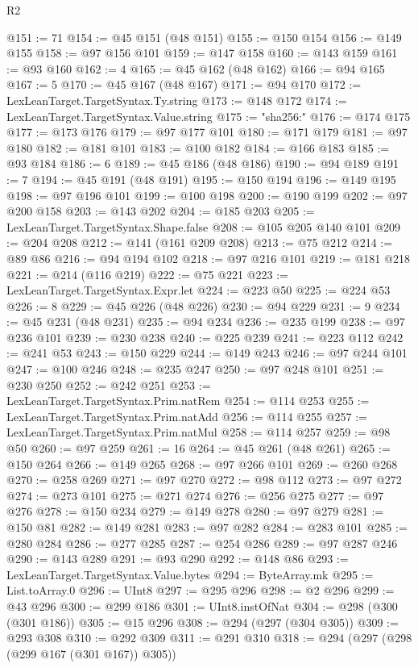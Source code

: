 \begin{lexlean}{R2}
\begin{coremodule}
@151 := 71
@154 := @45 @151 (@48 @151)
@155 := @150 @154
@156 := @149 @155
@158 := @97 @156 @101
@159 := @147 @158
@160 := @143 @159
@161 := @93 @160
@162 := 4
@165 := @45 @162 (@48 @162)
@166 := @94 @165
@167 := 5
@170 := @45 @167 (@48 @167)
@171 := @94 @170
@172 := LexLeanTarget.TargetSyntax.Ty.string
@173 := @148 @172
@174 := LexLeanTarget.TargetSyntax.Value.string
@175 := "sha256:"
@176 := @174 @175
@177 := @173 @176
@179 := @97 @177 @101
@180 := @171 @179
@181 := @97 @180
@182 := @181 @101
@183 := @100 @182
@184 := @166 @183
@185 := @93 @184
@186 := 6
@189 := @45 @186 (@48 @186)
@190 := @94 @189
@191 := 7
@194 := @45 @191 (@48 @191)
@195 := @150 @194
@196 := @149 @195
@198 := @97 @196 @101
@199 := @100 @198
@200 := @190 @199
@202 := @97 @200 @158
@203 := @143 @202
@204 := @185 @203
@205 := LexLeanTarget.TargetSyntax.Shape.false
@208 := @105 @205 @140 @101
@209 := @204 @208
@212 := @141 (@161 @209 @208)
@213 := @75 @212
@214 := @89 @86
@216 := @94 @194 @102
@218 := @97 @216 @101
@219 := @181 @218
@221 := @214 (@116 @219)
@222 := @75 @221
@223 := LexLeanTarget.TargetSyntax.Expr.let
@224 := @223 @50
@225 := @224 @53
@226 := 8
@229 := @45 @226 (@48 @226)
@230 := @94 @229
@231 := 9
@234 := @45 @231 (@48 @231)
@235 := @94 @234
@236 := @235 @199
@238 := @97 @236 @101
@239 := @230 @238
@240 := @225 @239
@241 := @223 @112
@242 := @241 @53
@243 := @150 @229
@244 := @149 @243
@246 := @97 @244 @101
@247 := @100 @246
@248 := @235 @247
@250 := @97 @248 @101
@251 := @230 @250
@252 := @242 @251
@253 := LexLeanTarget.TargetSyntax.Prim.natRem
@254 := @114 @253
@255 := LexLeanTarget.TargetSyntax.Prim.natAdd
@256 := @114 @255
@257 := LexLeanTarget.TargetSyntax.Prim.natMul
@258 := @114 @257
@259 := @98 @50
@260 := @97 @259
@261 := 16
@264 := @45 @261 (@48 @261)
@265 := @150 @264
@266 := @149 @265
@268 := @97 @266 @101
@269 := @260 @268
@270 := @258 @269
@271 := @97 @270
@272 := @98 @112
@273 := @97 @272
@274 := @273 @101
@275 := @271 @274
@276 := @256 @275
@277 := @97 @276
@278 := @150 @234
@279 := @149 @278
@280 := @97 @279
@281 := @150 @81
@282 := @149 @281
@283 := @97 @282
@284 := @283 @101
@285 := @280 @284
@286 := @277 @285
@287 := @254 @286
@289 := @97 @287 @246
@290 := @143 @289
@291 := @93 @290
@292 := @148 @86
@293 := LexLeanTarget.TargetSyntax.Value.bytes
@294 := ByteArray.mk
@295 := List.toArray.{0}
@296 := UInt8
@297 := @295 @296
@298 := @2 @296
@299 := @43 @296
@300 := @299 @186
@301 := UInt8.instOfNat
@304 := @298 (@300 (@301 @186))
@305 := @15 @296
@308 := @294 (@297 (@304 @305))
@309 := @293 @308
@310 := @292 @309
@311 := @291 @310
@318 := @294 (@297 (@298 (@299 @167 (@301 @167)) @305))

\end{coremodule}
\end{lexlean}
